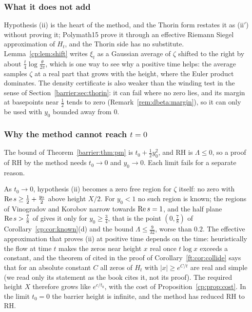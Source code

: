 \subsubsection{What it does not add}

Hypothesis (ii) is the heart of the method, and the Thorin form restates it as (ii$'$) without proving it; Polymath15 prove it through an effective Riemann Siegel approximation of $H_t$, and the Thorin side has no substitute. Lemma~\ref{cp:lem:shift} writes $\xi_t$ as a Gaussian average of $\zeta$ shifted to the right by about $\frac t4\log\frac\theta{2\pi}$, which is one way to see why a positive time helps: the average samples $\zeta$ at a real part that grows with the height, where the Euler product dominates. The density certificate is also weaker than the winding test in the sense of Section~\ref{barrier:sec:thorin}: it can fail where no zero lies, and its margin at basepoints near $\frac12$ tends to zero (Remark~\ref{rem:dbeta:margin}), so it can only be used with $y_0$ bounded away from $0$.

\subsubsection{Why the method cannot reach \texorpdfstring{$t=0$}{t=0}}

The bound of Theorem~\ref{barrier:thm:pm} is $t_0+\frac12y_0^2$, and RH is $\Lambda\le0$, so a proof of RH by the method needs $t_0\to0$ and $y_0\to0$. Each limit fails for a separate reason.

As $t_0\to0$, hypothesis (ii) becomes a zero free region for $\zeta$ itself: no zero with $\operatorname{Re} s\ge\frac12+\frac{y_0}2$ above height $X/2$. For $y_0<1$ no such region is known; the regions of Vinogradov and Korobov narrow towards $\operatorname{Re} s=1$, and the half plane $\operatorname{Re} s>\frac78$ of \cite{OAI26a} gives it only for $y_0\ge\frac34$, that is the point $(0,\frac78)$ of Corollary~\ref{cp:cor:known}(d) and the bound $\Lambda\le\frac9{32}$, worse than $0.2$. The effective approximation that proves (ii) at positive time depends on the time: heuristically the flow at time $t$ makes the zeros near height $x$ real once $t\log x$ exceeds a constant, and the theorem of \cite{Polymath} cited in the proof of Corollary~\ref{ft:cor:collide} says that for an absolute constant $C$ all zeros of $H_t$ with $|x|\ge e^{C/t}$ are real and simple (we read only its statement as the book cites it, not its proof). The required height $X$ therefore grows like $e^{c/t_0}$, with the cost of Proposition~\ref{cp:prop:cost}. In the limit $t_0=0$ the barrier height is infinite, and the method has reduced RH to RH.

